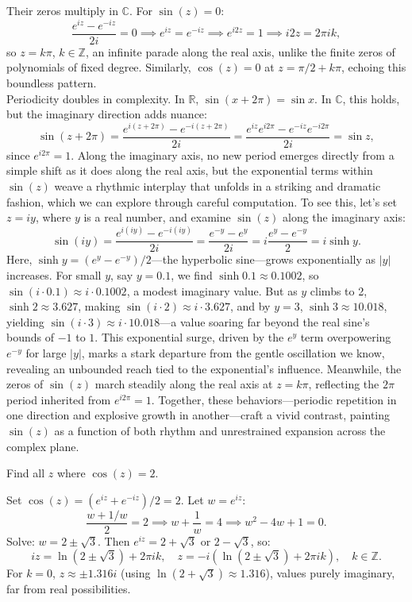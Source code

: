 \noindent Their zeros multiply in $\mathbb{C}$. For $\sin(z) = 0$:
\[
\frac{e^{iz} - e^{-iz}}{2i} = 0 \implies e^{iz} = e^{-iz} \implies e^{i2z} = 1 \implies i2z = 2\pi i k,
\]
so $z = k\pi$, $k \in \mathbb{Z}$, an infinite parade along the real axis, unlike the finite zeros of polynomials of fixed degree. Similarly, $\cos(z) = 0$ at $z = \pi/2 + k\pi$, echoing this boundless pattern. \\

\noindent Periodicity doubles in complexity. In $\mathbb{R}$, $\sin(x + 2\pi) = \sin x$. In $\mathbb{C}$, this holds, but the imaginary direction adds nuance:
\[
\sin(z + 2\pi) = \frac{e^{i(z + 2\pi)} - e^{-i(z + 2\pi)}}{2i} = \frac{e^{iz} e^{i2\pi} - e^{-iz} e^{-i2\pi}}{2i} = \sin z,
\]
\noindent since $e^{i2\pi} = 1$. Along the imaginary axis, no new period emerges directly from a simple shift as it does along the real axis, but the exponential terms within $\sin(z)$ weave a rhythmic interplay that unfolds in a striking and dramatic fashion, which we can explore through careful computation. To see this, let’s set $z = i y$, where $y$ is a real number, and examine $\sin(z)$ along the imaginary axis:
\[
\sin(i y) = \frac{e^{i (i y)} - e^{-i (i y)}}{2i} = \frac{e^{-y} - e^{y}}{2i} = i \frac{e^{y} - e^{-y}}{2} = i \sinh y.
\]
Here, $\sinh y = (e^y - e^{-y})/2$—the hyperbolic sine—grows exponentially as $|y|$ increases. For small $y$, say $y = 0.1$, we find $\sinh 0.1 \approx 0.1002$, so $\sin(i \cdot 0.1) \approx i \cdot 0.1002$, a modest imaginary value. But as $y$ climbs to 2, $\sinh 2 \approx 3.627$, making $\sin(i \cdot 2) \approx i \cdot 3.627$, and by $y = 3$, $\sinh 3 \approx 10.018$, yielding $\sin(i \cdot 3) \approx i \cdot 10.018$—a value soaring far beyond the real sine’s bounds of $-1$ to $1$. This exponential surge, driven by the $e^y$ term overpowering $e^{-y}$ for large $|y|$, marks a stark departure from the gentle oscillation we know, revealing an unbounded reach tied to the exponential’s influence. Meanwhile, the zeros of $\sin(z)$ march steadily along the real axis at $z = k\pi$, reflecting the $2\pi$ period inherited from $e^{i2\pi} = 1$. Together, these behaviors—periodic repetition in one direction and explosive growth in another—craft a vivid contrast, painting $\sin(z)$ as a function of both rhythm and unrestrained expansion across the complex plane.

\exampleline
\begin{example}
Find all $z$ where $\cos(z) = 2$.

\begin{solution}
Set $\cos(z) = (e^{iz} + e^{-iz})/2 = 2$. Let $w = e^{iz}$:
\[
\frac{w + 1/w}{2} = 2 \implies w + \frac{1}{w} = 4 \implies w^2 - 4w + 1 = 0.
\]
Solve: $w = 2 \pm \sqrt{3}$. Then $e^{iz} = 2 + \sqrt{3}$ or $2 - \sqrt{3}$, so:
\[
iz = \ln(2 \pm \sqrt{3}) + 2\pi i k, \quad z = -i \left( \ln(2 \pm \sqrt{3}) + 2\pi i k \right), \quad k \in \mathbb{Z}.
\]
For $k = 0$, $z \approx \pm 1.316i$ (using $\ln(2 + \sqrt{3}) \approx 1.316$), values purely imaginary, far from real possibilities.
\end{solution}
\end{example}
\exampleline

